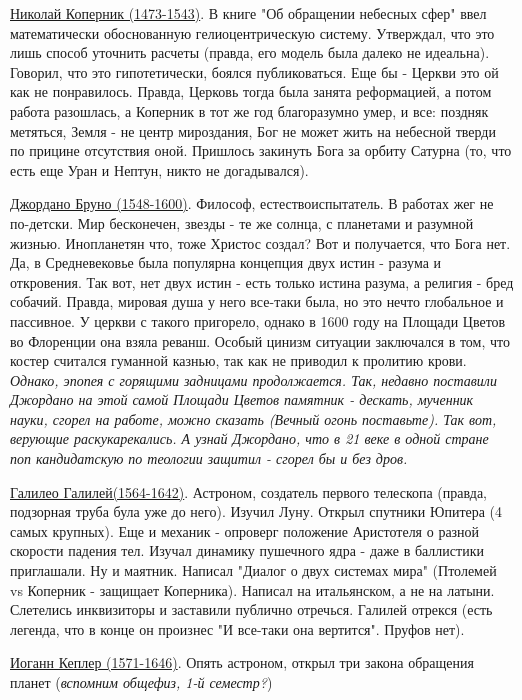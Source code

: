 \underline{Николай Коперник (1473-1543)}. В книге "Об обращении небесных сфер" ввел математически обоснованную гелиоцентрическую систему. Утверждал, что это лишь способ уточнить расчеты (правда, его модель была далеко не идеальна). Говорил, что это гипотетически, боялся публиковаться. Еще бы - Церкви это ой как не понравилось. Правда, Церковь тогда была занята реформацией, а потом работа разошлась, а Коперник в тот же год благоразумно умер, и все: поздняк метяться, Земля - не центр мироздания, Бог не может жить на небесной тверди по прицине отсутствия оной. Пришлось закинуть Бога за орбиту Сатурна (то, что есть еще Уран и Нептун, никто не догадывался).

\underline{Джордано Бруно (1548-1600)}. Философ, естествоиспытатель. В работах жег не по-детски. Мир бесконечен, звезды - те же солнца, с планетами и разумной жизнью. Инопланетян что, тоже Христос создал? Вот и получается, что Бога нет. Да, в Средневековье была популярна концепция двух истин - разума и откровения. Так вот, нет двух истин - есть только истина разума, а религия - бред собачий.  Правда, мировая душа у него все-таки была, но это нечто глобальное и пассивное. У церкви с такого пригорело, однако в 1600 году на Площади Цветов во Флоренции она взяла реванш. Особый цинизм ситуации заключался в том, что костер считался гуманной казнью, так как не приводил к пролитию крови. \textit{Однако, эпопея с горящими задницами продолжается. Так, недавно поставили Джордано на этой самой Площади Цветов памятник - дескать, мученник науки, сгорел на работе, можно сказать (\textit{Вечный огонь поставьте}). Так вот, верующие раскукарекались. А узнай Джордано, что в 21 веке в одной стране поп кандидатскую по теологии защитил - сгорел бы и без дров.}

\underline{Галилео Галилей(1564-1642)}. Астроном, создатель первого телескопа (правда, подзорная труба була уже до него). Изучил Луну. Открыл спутники Юпитера (4 самых крупных). Еще и механик - опроверг положение Аристотеля о разной скорости падения тел. Изучал динамику пушечного ядра - даже в баллистики приглашали. Ну и маятник. Написал "Диалог о двух системах мира" (Птолемей vs Коперник - защищает Коперника). Написал на итальянском, а не на латыни. Слетелись инквизиторы и заставили публично отречься. Галилей отрекся (есть легенда, что в конце он произнес "И все-таки она вертится". Пруфов нет).  

\underline{Иоганн Кеплер (1571-1646)}. Опять астроном, открыл три закона обращения планет (\textit{вспомним общефиз, 1-й семестр?})

